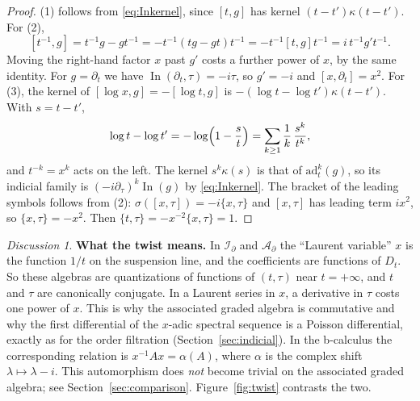 \documentclass[11pt,oneside,reqno]{article}
\DeclareMathOperator{\In}{In}
\newcommand{\Id}{\mathcal I_\partial}
\newcommand{\Ad}{\mathcal A_\partial}
\newcommand{\lx}{\log x}
\theoremstyle{plain}
\theoremstyle{definition}
\theoremstyle{remark}
\newtheorem*{discussion}{Discussion}
\begin{document}
\begin{proof}
(1) follows from \eqref{eq:Inkernel}, since \([t,g]\) has kernel
\((t-t')\kappa(t-t')\). For (2),
\[
 [t^{-1},g]=t^{-1}g-gt^{-1}=-t^{-1}(tg-gt)t^{-1}=-t^{-1}[t,g]t^{-1}
 =i\,t^{-1}g't^{-1}.
\]
Moving the right-hand factor \(x\) past \(g'\) costs a further power of
\(x\), by the same identity. For \(g=\partial_t\) we have
\(\In(\partial_t,\tau)=-i\tau\), so \(g'=-i\) and \([x,\partial_t]=x^2\).
For (3), the kernel of \([\lx,g]=-[\log t,g]\) is
\(-(\log t-\log t')\kappa(t-t')\). With \(s=t-t'\),
\[
 \log t-\log t'=-\log\Bigl(1-\frac st\Bigr)=\sum_{k\ge1}\frac1k\,\frac{s^k}{t^k},
\]
and \(t^{-k}=x^k\) acts on the left. The kernel \(s^k\kappa(s)\) is that of
\(\mathrm{ad}_t^k(g)\), so its indicial family is
\((-i\partial_\tau)^k\In(g)\) by \eqref{eq:Inkernel}. The bracket of the
leading symbols follows from (2):
\(\sigma([x,\tau])=-i\{x,\tau\}\) and \([x,\tau]\) has leading term
\(ix^2\), so \(\{x,\tau\}=-x^2\). Then
\(\{t,\tau\}=-x^{-2}\{x,\tau\}=1\).
\end{proof}

\begin{discussion}
\textbf{What the twist means.} In \(\Id\) and \(\Ad\) the ``Laurent
variable'' \(x\) is the function \(1/t\) on the suspension line, and the
coefficients are functions of \(D_t\). So these algebras are
quantizations of functions of \((t,\tau)\) near \(t=+\infty\), and \(t\)
and \(\tau\) are canonically conjugate. In a Laurent series in \(x\), a
derivative in \(\tau\) costs one power of \(x\). This is why the
associated graded algebra is commutative and why the first differential
of the \(x\)-adic spectral sequence is a Poisson differential, exactly as
for the order filtration (Section~\ref{sec:indicial}). In the b-calculus
the corresponding relation is \(x^{-1}Ax=\alpha(A)\), where \(\alpha\) is
the complex shift \(\lambda\mapsto\lambda-i\). This automorphism does
\emph{not} become trivial on the associated graded algebra; see
Section~\ref{sec:comparison}. Figure~\ref{fig:twist} contrasts the two.
\end{discussion}
\end{document}
